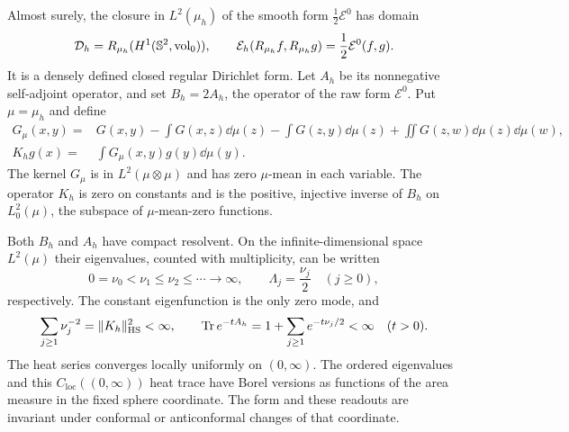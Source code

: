\begin{proposition}\label{prop:continuum-form}
Almost surely, the closure in $L^2(\mu_h)$ of the smooth form
$\frac12\mathcal E^0$ has domain
\begin{equation}\label{eq:continuum-form-domain}
 \mathcal D_h=R_{\mu_h}(H^1(\mathbb S^2,\mathrm{vol}_0)),\qquad
 \mathcal E_h(R_{\mu_h}f,R_{\mu_h}g)=\frac12\mathcal E^0(f,g).
\end{equation}
It is a densely defined closed regular Dirichlet form.  Let $A_h$ be its
nonnegative self-adjoint operator, and set $B_h=2A_h$, the operator of the
raw form $\mathcal E^0$.  Put $\mu=\mu_h$ and define
\begin{align}
 G_\mu(x,y)={}&G(x,y)-\int G(x,z)\dd\mu(z)-\int G(z,y)\dd\mu(z)
       +\iint G(z,w)\dd\mu(z)\dd\mu(w),\label{eq:double-centered-green}\\
 K_hg(x)={}&\int G_\mu(x,y)g(y)\dd\mu(y).
       \label{eq:continuum-inverse}
\end{align}
The kernel $G_\mu$ is in $L^2(\mu\otimes\mu)$ and has zero $\mu$-mean
in each variable.  The operator $K_h$ is zero on constants and is the
positive, injective inverse of $B_h$ on $L^2_0(\mu)$, the subspace of
$\mu$-mean-zero functions.

Both $B_h$ and $A_h$ have compact resolvent.  On the infinite-dimensional
space $L^2(\mu)$ their eigenvalues, counted with multiplicity, can be
written
\[
 0=\nu_0<\nu_1\le\nu_2\le\cdots\longrightarrow\infty,
 \qquad \Lambda_j=\frac{\nu_j}{2}\quad(j\ge0),
\]
respectively.  The constant eigenfunction is the only zero mode, and
\begin{equation}\label{eq:continuum-inverse-summability}
 \sum_{j\ge1}\nu_j^{-2}=\|K_h\|_{\mathrm{HS}}^2<\infty,
 \qquad
 \operatorname{Tr} e^{-tA_h}=1+\sum_{j\ge1}e^{-t\nu_j/2}<\infty\quad(t>0).
\end{equation}
The heat series converges locally uniformly on $(0,\infty)$.  The ordered
eigenvalues and this $C_{\mathrm{loc}}((0,\infty))$ heat trace have Borel
versions as functions of the area measure in the fixed sphere coordinate.
The form and these readouts are invariant under conformal or
anticonformal changes of that coordinate.
\end{proposition}

